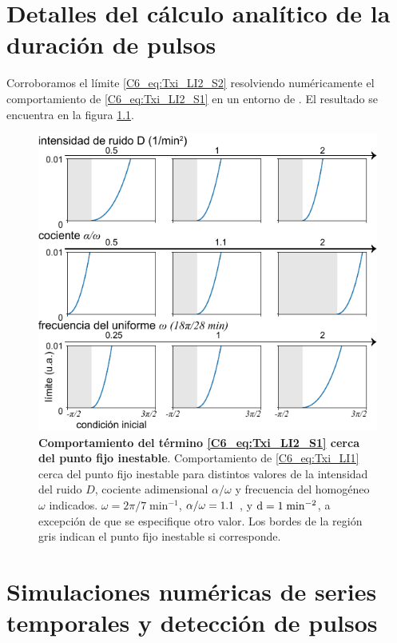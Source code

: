 \documentclass[./main.tex]{subfiles}
\begin{document}
\begin{subappendices}
\chapter{Detalles del cálculo analítico de la duración de pulsos}
\label{C6_ap:Txi_LI2_S2}

Corroboramos el límite \ref{C6_eq:Txi_LI2_S2} resolviendo numéricamente el comportamiento de \ref{C6_eq:Txi_LI2_S1} en un entorno de \xxi. El resultado se encuentra en la figura \ref{C6_fig:Txi_LI2_S2}. 

\begin{figure}
    \centering
    \includegraphics[width=1\columnwidth]{figures/chapter6/C6_limite_int_2.pdf} 
    \caption{\textbf{Comportamiento del término \ref{C6_eq:Txi_LI2_S1} cerca del punto fijo inestable}. Comportamiento de \ref{C6_eq:Txi_LI1} cerca del punto fijo inestable \xxi para distintos valores de la intensidad del ruido $D$, cociente adimensional $\alpha/\omega$ y frecuencia del homogéneo $\omega$ indicados. $\omega = 2\pi/7 \;\text{min}^{-1}$, $\alpha/\omega = 1.1$ , y $\mathrm{d} = 1 \;\text{min}^{-2}$, a excepción de que se especifique otro valor. Los bordes de la región gris indican el punto fijo inestable si corresponde.}
    \label{C6_fig:Txi_LI2_S2}
\end{figure}

\chapter{Simulaciones numéricas de series temporales y detección de pulsos}
\label{C6_ap:traces}
\label{C7_ap:OU_OUD_traces}


\end{subappendices}
\end{document}
